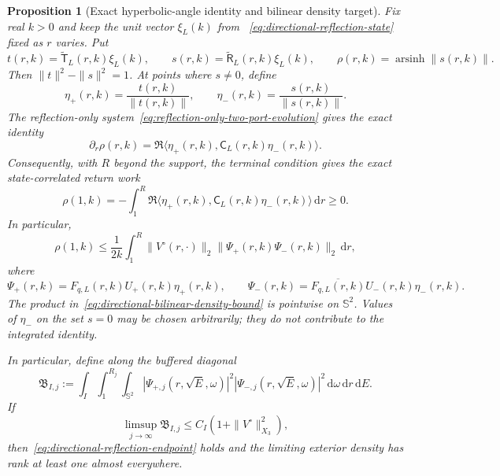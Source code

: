 \documentclass[11pt]{article}
\newcommand{\dd}{\,\mathrm d}
\newtheorem{proposition}[theorem]{Proposition}
\theoremstyle{definition}
\theoremstyle{remark}
\begin{document}
\begin{proposition}[Exact hyperbolic-angle identity and bilinear density target]
\label{prop:directional-reflection-hyperbolic-angle}
Fix real $k>0$ and keep the unit vector $\xi_L(k)$ from
~\eqref{eq:directional-reflection-state} fixed as $r$ varies.  Put
\begin{equation}
 t(r,k)=\widetilde{\mathsf T}_L(r,k)\xi_L(k),
 \qquad
 s(r,k)=\widetilde{\mathsf R}_L(r,k)\xi_L(k),
 \qquad
 \rho(r,k)=\operatorname{arsinh}\|s(r,k)\|.
 \label{eq:directional-hyperbolic-state}
\end{equation}
Then $\|t\|^2-\|s\|^2=1$.  At points where $s\ne0$, define
\begin{equation}
 \eta_+(r,k)=\frac{t(r,k)}{\|t(r,k)\|},
 \qquad
 \eta_-(r,k)=\frac{s(r,k)}{\|s(r,k)\|}.
\end{equation}
The reflection-only system~\eqref{eq:reflection-only-two-port-evolution}
gives the exact identity
\begin{equation}
 \partial_r\rho(r,k)
 =\Re\langle\eta_+(r,k),\mathsf C_L(r,k)\eta_-(r,k)\rangle.
 \label{eq:directional-hyperbolic-derivative}
\end{equation}
Consequently, with $R$ beyond the support, the terminal condition gives the
exact state-correlated return work
\begin{equation}
 \rho(1,k)
 =-\int_1^R
 \Re\langle\eta_+(r,k),\mathsf C_L(r,k)\eta_-(r,k)\rangle\dd r
 \geq0.
 \label{eq:directional-state-correlated-return-work}
\end{equation}
In particular,
\begin{equation}
 \rho(1,k)
 \leq\frac1{2k}\int_1^R
 \|V^\circ(r,\cdot)\|_2
 \|\Psi_+(r,k)\Psi_-(r,k)\|_2\dd r,
 \label{eq:directional-bilinear-density-bound}
\end{equation}
where
\begin{equation}
 \Psi_+(r,k)=F_{q,L}(r,k)U_+(r,k)\eta_+(r,k),
 \qquad
 \Psi_-(r,k)=\overline{F_{q,L}(r,k)}U_-(r,k)\eta_-(r,k).
 \label{eq:directional-dressed-waves}
\end{equation}
The product in~\eqref{eq:directional-bilinear-density-bound} is pointwise on
$\mathbb S^2$.  Values of $\eta_-$ on the set $s=0$ may be chosen arbitrarily;
they do not contribute to the integrated identity.

In particular, define along the buffered diagonal
\begin{equation}
 \mathfrak B_{I,j}
 :=\int_I\int_1^{R_j}\int_{\mathbb S^2}
 |\Psi_{+,j}(r,\sqrt E,\omega)|^2
 |\Psi_{-,j}(r,\sqrt E,\omega)|^2
 \dd\omega\dd r\dd E.
 \label{eq:directional-bilinear-density-action}
\end{equation}
If
\begin{equation}
 \limsup_{j\to\infty}\mathfrak B_{I,j}
 \leq C_I\left(1+\|V^\circ\|_{X_3}^2\right),
 \label{eq:directional-bilinear-density-target}
\end{equation}
then~\eqref{eq:directional-reflection-endpoint} holds and the limiting
exterior density has rank at least one almost everywhere.
\end{proposition}
\end{document}
